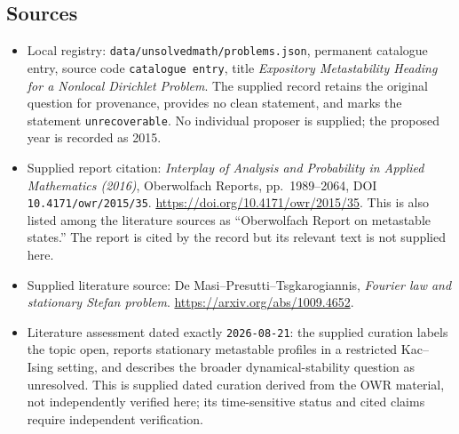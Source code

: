 \documentclass[11pt]{article}
\begin{document}
\subsection{Sources}
\begin{itemize}
\item Local registry: \texttt{data/unsolvedmath/problems.json}, permanent catalogue entry, source code \texttt{catalogue entry}, title \emph{Expository Metastability Heading for a Nonlocal Dirichlet Problem}. The supplied record retains the original question for provenance, provides no clean statement, and marks the statement \texttt{unrecoverable}. No individual proposer is supplied; the proposed year is recorded as 2015.
\item Supplied report citation: \emph{Interplay of Analysis and Probability in Applied Mathematics (2016)}, Oberwolfach Reports, pp.~1989--2064, DOI \texttt{10.4171/owr/2015/35}. \url{https://doi.org/10.4171/owr/2015/35}. This is also listed among the literature sources as ``Oberwolfach Report on metastable states.'' The report is cited by the record but its relevant text is not supplied here.
\item Supplied literature source: De Masi--Presutti--Tsgkarogiannis, \emph{Fourier law and stationary Stefan problem}. \url{https://arxiv.org/abs/1009.4652}.
\item Literature assessment dated exactly \texttt{2026-08-21}: the supplied curation labels the topic open, reports stationary metastable profiles in a restricted Kac--Ising setting, and describes the broader dynamical-stability question as unresolved. This is supplied dated curation derived from the OWR material, not independently verified here; its time-sensitive status and cited claims require independent verification.
\end{itemize}
\end{document}
